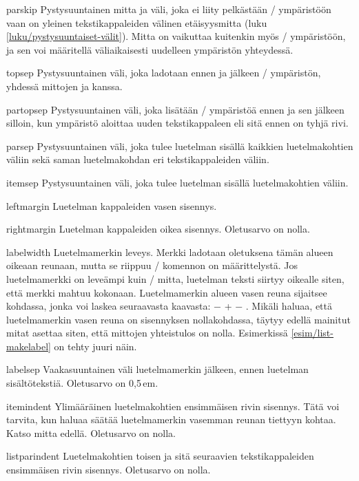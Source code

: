 \begin{maaritelma}{}
\item [parskip] Pystysuuntainen mitta ja väli, joka ei liity pelkästään
  \-/ ympäristöön vaan on yleinen tekstikappaleiden
  välinen etäisyysmitta (luku \ref{luku/pystysuuntaiset-välit}). Mitta
  on vaikuttaa kuitenkin myös \-/ ympäristöön, ja sen
  voi määritellä väliaikaisesti uudelleen ympäristön yhteydessä.
\item [topsep] Pystysuuntainen väli, joka ladotaan ennen ja jälkeen
  \-/ ympäristön, yhdessä mittojen  ja
   kanssa.
\item [partopsep] Pystysuuntainen väli, joka lisätään
  \-/ ympäristöä ennen ja sen jälkeen silloin, kun
  ympäristö aloittaa uuden tekstikappaleen eli sitä ennen on tyhjä rivi.
\item [parsep] Pystysuuntainen väli, joka tulee luetelman sisällä
  kaikkien luetelmakohtien väliin sekä saman luetelmakohdan eri
  tekstikappaleiden väliin.
\item [itemsep] Pystysuuntainen väli, joka tulee luetelman sisällä
  luetelmakohtien väliin.
\item [leftmargin] Luetelman kappaleiden vasen sisennys.
\item [rightmargin] Luetelman kappaleiden oikea sisennys. Oletusarvo on
  nolla.
\item [labelwidth] Luetelmamerkin leveys. Merkki ladotaan oletuksena
  tämän alueen oikeaan reunaan, mutta se riippuu \-/
  komennon on määrittelystä. Jos luetelmamerkki on leveämpi kuin
  \-/ mitta, luetelman teksti siirtyy oikealle siten,
  että merkki mahtuu kokonaan. Luetelmamerkin alueen vasen reuna
  sijaitsee kohdassa, jonka voi laskea seuraavasta kaavasta:
   −  +  −
  . Mikäli haluaa, että luetelmamerkin vasen reuna on
  sisennyksen nollakohdassa, täytyy edellä mainitut mitat asettaa siten,
  että mittojen yhteistulos on nolla. Esimerkissä
  \ref{esim/list-makelabel} on tehty juuri näin.
\item [labelsep] Vaakasuuntainen väli luetelmamerkin jälkeen, ennen
  luetelman sisältötekstiä. Oletusarvo on 0,5\,em.
\item [itemindent] Ylimääräinen luetelmakohtien ensimmäisen rivin
  sisennys. Tätä voi tarvita, kun haluaa säätää luetelmamerkin vasemman
  reunan tiettyyn kohtaa. Katso mitta  edellä.
  Oletusarvo on nolla.
\item [listparindent] Luetelmakohtien toisen ja sitä seuraavien
  tekstikappaleiden ensimmäisen rivin sisennys. Oletusarvo on nolla.
\end{maaritelma}

